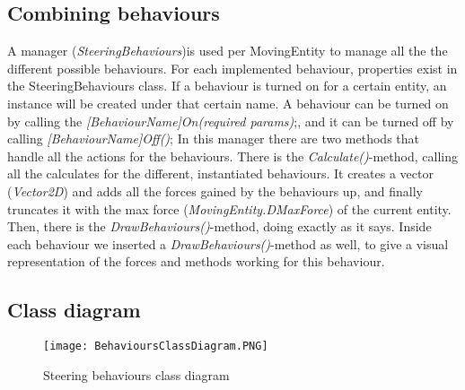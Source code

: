 \subsection[How the steering behaviours are combined]{Combining behaviours}\label{subsec:combiningBehaviours}
A manager (\textit{SteeringBehaviours})is used per MovingEntity to manage all the the different possible behaviours.
For each implemented behaviour, properties exist in the SteeringBehaviours class.
If a behaviour is turned on for a certain entity, an instance will be created under that certain name.
A behaviour can be turned on by calling the \textit{[BehaviourName]On(required params)};, and it can be turned off by calling \textit{[BehaviourName]Off()};
In this manager there are two methods that handle all the actions for the behaviours.
There is the \textit{Calculate()}-method, calling all the calculates for the different, instantiated behaviours.
It creates a vector (\textit{Vector2D}) and adds all the forces gained by the behaviours up, and finally truncates it with the max force (\textit{MovingEntity.DMaxForce}) of the current entity.
Then, there is the \textit{DrawBehaviours()}-method, doing exactly as it says.
Inside each behaviour we inserted a \textit{DrawBehaviours()}-method as well, to give a visual representation of the forces and methods working for this behaviour.
\subsection[The class diagram of our behaviour system]{Class diagram}
\begin{figure}[h!]
    \begin{center}
        \texttt{[image: BehavioursClassDiagram.PNG]}
    \end{center}
    \caption{Steering behaviours class diagram}
    \label{fig:SteeringBehavioursClassDiagram}
\end{figure}
\newpage
